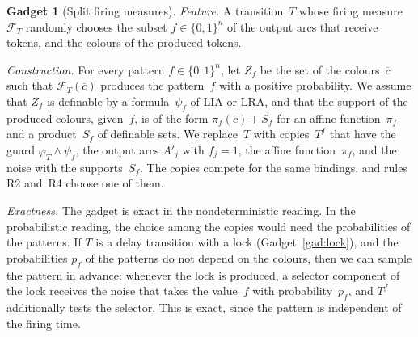 \documentclass[11pt]{article}
\theoremstyle{definition}
\newcommand{\cvec}{\overline{c}}
\newtheorem{gadget}{Gadget}
\begin{document}
\begin{gadget}[Split firing measures]\label{gad:split}
  \emph{Feature.} A transition~$T$ whose firing measure $\mathcal{F}_T$
  randomly chooses the subset $f \in \{0, 1\}^n$ of the output arcs that
  receive tokens, and the colours of the produced tokens.

  \emph{Construction.} For every pattern $f \in \{0, 1\}^n$, let $Z_f$ be the
  set of the colours~$\cvec$ such that $\mathcal{F}_T(\cvec)$ produces the
  pattern~$f$ with a positive probability. We assume that $Z_f$ is definable
  by a formula~$\psi_f$ of LIA or LRA, and that the support of the produced
  colours, given~$f$, is of the form $\pi_f(\cvec) + S_f$ for an affine
  function~$\pi_f$ and a product~$S_f$ of definable sets. We replace~$T$
  with copies~$T^f$ that have the guard $\varphi_T \wedge \psi_f$, the output
  arcs $A'_j$ with $f_j = 1$, the affine function~$\pi_f$, and the noise with
  the supports~$S_f$. The copies compete for the same bindings, and rules R2
  and~R4 choose one of them.

  \emph{Exactness.} The gadget is exact in the nondeterministic reading. In
  the probabilistic reading, the choice among the copies would need the
  probabilities of the patterns. If $T$ is a delay transition with a lock
  (Gadget~\ref{gad:lock}), and the probabilities $p_f$ of the patterns do not
  depend on the colours, then we can sample the pattern in advance: whenever
  the lock is produced, a selector component of the lock receives the noise
  that takes the value~$f$ with probability~$p_f$, and $T^f$ additionally
  tests the selector. This is exact, since the pattern is independent of the
  firing time.
\end{gadget}
\end{document}
